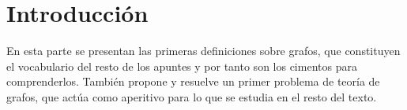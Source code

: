 \part{Introducción}

En esta parte se presentan las primeras definiciones sobre grafos, que constituyen el vocabulario del resto de los apuntes y por tanto son los cimentos para comprenderlos. También propone y resuelve un primer problema de teoría de grafos, que actúa como aperitivo para lo que se estudia en el resto del texto.

